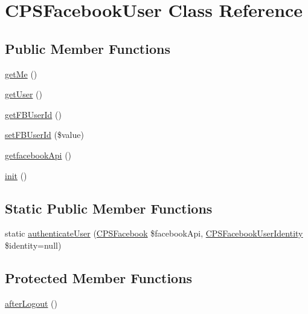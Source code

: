 \hypertarget{classCPSFacebookUser}{
\section{CPSFacebookUser Class Reference}
\label{classCPSFacebookUser}
}
\subsection*{Public Member Functions}
\begin{DoxyCompactItemize}
\item 
\hyperlink{classCPSFacebookUser_a6bc057a9b0c03f8147a4294936b2494b}{getMe} ()
\item 
\hyperlink{classCPSFacebookUser_ae81b7186fb97a7c6457edcc68c9aa2ef}{getUser} ()
\item 
\hyperlink{classCPSFacebookUser_a0ef2f4b4ea68bcd957152a5b46a6612e}{getFBUserId} ()
\item 
\hyperlink{classCPSFacebookUser_a9ff6cf9ceb9df1eb1fcd60a88db9e9e5}{setFBUserId} (\$value)
\item 
\hyperlink{classCPSFacebookUser_a875f91242dde0ebd321a43ec1f555a62}{getfacebookApi} ()
\item 
\hyperlink{classCPSFacebookUser_a4be4055f3361d4800e16bc2e2e38cda6}{init} ()
\end{DoxyCompactItemize}
\subsection*{Static Public Member Functions}
\begin{DoxyCompactItemize}
\item 
static \hyperlink{classCPSFacebookUser_aff132084818e40b18cc758c1bf7bf905}{authenticateUser} (\hyperlink{classCPSFacebook}{CPSFacebook} \$facebookApi, \hyperlink{classCPSFacebookUserIdentity}{CPSFacebookUserIdentity} \$identity=null)
\end{DoxyCompactItemize}
\subsection*{Protected Member Functions}
\begin{DoxyCompactItemize}
\item 
\hyperlink{classCPSFacebookUser_a47779b3c93475b9c61f3928bc8247f8d}{afterLogout} ()
\end{DoxyCompactItemize}
